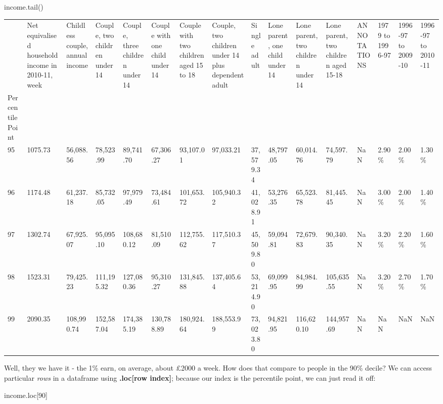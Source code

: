\documentclass[
  letterpaper,
  DIV=11,
  numbers=noendperiod]{scrreprt}
\newenvironment{Shaded}{\begin{snugshade}}{\end{snugshade}}
\newcommand{\DecValTok}[1]{\textcolor[rgb]{0.68,0.00,0.00}{#1}}
\newcommand{\NormalTok}[1]{\textcolor[rgb]{0.00,0.23,0.31}{#1}}
\begin{document}
\begin{Shaded}
\begin{Highlighting}[]
\NormalTok{income.tail()}
\end{Highlighting}
\end{Shaded}

\begin{longtable}[]{@{}llllllllllllllll@{}}
\toprule()
& Net equivalised household income in 2010-11, week & Childless couple,
annual income & Couple, two children under 14 & Couple, three children
under 14 & Couple with one child under 14 & Couple with two children
aged 15 to 18 & Couple, two children under 14 plus dependent adult &
Single adult & Lone parent, one child under 14 & Lone parent, two
children under 14 & Lone parent, two children aged 15-18 & ANNOTATIONS &
1979 to 1996-97 & 1996-97 to 2009-10 & 1996-97 to 2010-11 \\
Percentile Point & & & & & & & & & & & & & & & \\
\midrule()
\endhead
95 & 1075.73 & 56,088.56 & 78,523.99 & 89,741.70 & 67,306.27 & 93,107.01
& 97,033.21 & 37,579.34 & 48,797.05 & 60,014.76 & 74,597.79 & NaN &
2.90\% & 2.00\% & 1.30\% \\
96 & 1174.48 & 61,237.18 & 85,732.05 & 97,979.49 & 73,484.61 &
101,653.72 & 105,940.32 & 41,028.91 & 53,276.35 & 65,523.78 & 81,445.45
& NaN & 3.00\% & 2.00\% & 1.40\% \\
97 & 1302.74 & 67,925.07 & 95,095.10 & 108,680.12 & 81,510.09 &
112,755.62 & 117,510.37 & 45,509.80 & 59,094.81 & 72,679.83 & 90,340.35
& NaN & 3.20\% & 2.20\% & 1.60\% \\
98 & 1523.31 & 79,425.23 & 111,195.32 & 127,080.36 & 95,310.27 &
131,845.88 & 137,405.64 & 53,214.90 & 69,099.95 & 84,984.99 & 105,635.55
& NaN & 3.20\% & 2.70\% & 1.70\% \\
99 & 2090.35 & 108,990.74 & 152,587.04 & 174,385.19 & 130,788.89 &
180,924.64 & 188,553.99 & 73,023.80 & 94,821.95 & 116,620.10 &
144,957.69 & NaN & NaN & NaN & NaN \\
\bottomrule()
\end{longtable}

Well, they we have it - the 1\% earn, on average, about £2000 a week.
How does that compare to people in the 90\% decile? We can access
particular \emph{rows} in a dataframe using \textbf{.loc{[}row
index{]}}; because our index is the percentile point, we can just read
it off:

\begin{Shaded}
\begin{Highlighting}[]
\NormalTok{income.loc[}\DecValTok{90}\NormalTok{]}
\end{Highlighting}
\end{Shaded}
\end{document}
